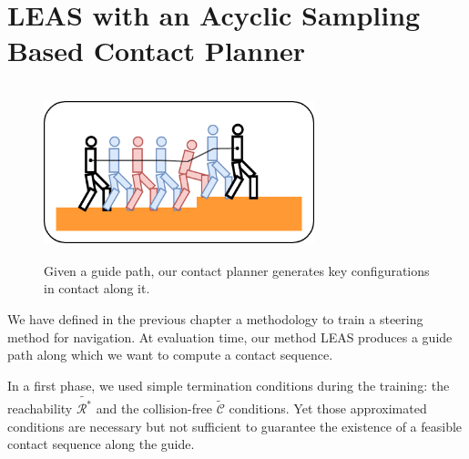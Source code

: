 


\chapter{LEAS with an Acyclic Sampling Based Contact Planner}
\label{sec:CP-SB}
\minitoc
\bigskip

\begin{figure}[h]
    \centering
    \includegraphics[width=0.7\textwidth, height=5cm]{Figures/Chapter_CPSB/strategies_cp_guide_A.png}
    \caption{Given a guide path, our contact planner generates key configurations in contact along it.}
    \label{fig:cp-sb:strategy_cp-sb}
\end{figure}


We have defined in the previous chapter a methodology to train a steering method for navigation.
At evaluation time, our method LEAS produces a guide path along which we want to compute a contact sequence.

In a first phase, we used simple termination conditions during the training: the reachability $\tilde{\mathcal{R}^*}$ and the collision-free $\tilde{\mathcal{C}}$ conditions.
Yet those approximated conditions are necessary but not sufficient to guarantee the existence of a feasible contact sequence along the guide.

